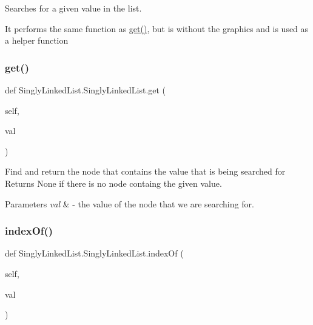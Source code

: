 Searches for a given value in the list. 

It performs the same function as \hyperlink{class_singly_linked_list_1_1_singly_linked_list_a81b05adc8e8bf959afe66e1923e4e474}{get()}, but is without the graphics and is used as a helper function \mbox{\label{class_singly_linked_list_1_1_singly_linked_list_a81b05adc8e8bf959afe66e1923e4e474}} 
\subsubsection{\texorpdfstring{get()}{get()}}
{\footnotesize\ttfamily def Singly\+Linked\+List.\+Singly\+Linked\+List.\+get (\begin{DoxyParamCaption}\item[{}]{self,  }\item[{}]{val }\end{DoxyParamCaption})}



Find and return the node that contains the value that is being searched for Returns None if there is no node containg the given value. 


\begin{DoxyParams}{Parameters}
{\em val} & -\/ the value of the node that we are searching for. \\
\hline
\end{DoxyParams}
\mbox{\label{class_singly_linked_list_1_1_singly_linked_list_a17fbbbcfb0ff4a47c90c2d0ac00b37a5}} 
\subsubsection{\texorpdfstring{index\+Of()}{indexOf()}}
{\footnotesize\ttfamily def Singly\+Linked\+List.\+Singly\+Linked\+List.\+index\+Of (\begin{DoxyParamCaption}\item[{}]{self,  }\item[{}]{val }\end{DoxyParamCaption})}



